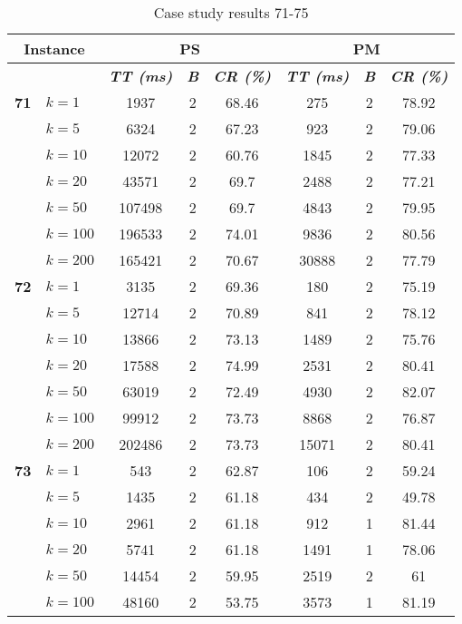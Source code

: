     \begin{table}[htbp]
    \caption{Case study results 71-75}
    \centering
    \begin{tabular}{|l|l|c|c|c|c|c|c|}
    \hline
    \multicolumn{ 2}{|c|}{\textbf{Instance}} & \multicolumn{ 3}{c|}{\textbf{PS}} & \multicolumn{ 3}{c|}{\textbf{PM}} \\ \hline
    \multicolumn{ 2}{|l|}{} & \textbf{\textit{TT (ms)}} & \textbf{\textit{B}} & \textbf{\textit{CR (\%)}} & \textbf{\textit{TT (ms)}} & \textbf{\textit{B}} & \textbf{\textit{CR (\%)}} \\ \hline
    \multicolumn{1}{|r|}{\textbf{71}} & $k=1$ & 1937 & 2 & 68.46 & 275 & 2 & 78.92 \\ 
     & $k=5$ & 6324 & 2 & 67.23 & 923 & 2 & 79.06 \\ 
     & $k=10$ & 12072 & 2 & 60.76 & 1845 & 2 & 77.33 \\ 
     & $k=20$ & 43571 & 2 & 69.7 & 2488 & 2 & 77.21 \\ 
     & $k=50$ & 107498 & 2 & 69.7 & 4843 & 2 & 79.95 \\ 
     & $k=100$ & 196533 & 2 & 74.01 & 9836 & 2 & 80.56 \\ 
     & $k=200$ & 165421 & 2 & 70.67 & 30888 & 2 & 77.79 \\ \hline
    \multicolumn{1}{|r|}{\textbf{72}} & $k=1$ & 3135 & 2 & 69.36 & 180 & 2 & 75.19 \\ 
     & $k=5$ & 12714 & 2 & 70.89 & 841 & 2 & 78.12 \\ 
     & $k=10$ & 13866 & 2 & 73.13 & 1489 & 2 & 75.76 \\ 
     & $k=20$ & 17588 & 2 & 74.99 & 2531 & 2 & 80.41 \\ 
     & $k=50$ & 63019 & 2 & 72.49 & 4930 & 2 & 82.07 \\ 
     & $k=100$ & 99912 & 2 & 73.73 & 8868 & 2 & 76.87 \\ 
     & $k=200$ & 202486 & 2 & 73.73 & 15071 & 2 & 80.41 \\ \hline
    \multicolumn{1}{|r|}{\textbf{73}} & $k=1$ & 543 & 2 & 62.87 & 106 & 2 & 59.24 \\ 
     & $k=5$ & 1435 & 2 & 61.18 & 434 & 2 & 49.78 \\ 
     & $k=10$ & 2961 & 2 & 61.18 & 912 & 1 & 81.44 \\ 
     & $k=20$ & 5741 & 2 & 61.18 & 1491 & 1 & 78.06 \\ 
     & $k=50$ & 14454 & 2 & 59.95 & 2519 & 2 & 61 \\ 
     & $k=100$ & 48160 & 2 & 53.75 & 3573 & 1 & 81.19 \\ 

\end{tabular}
\end{table}
